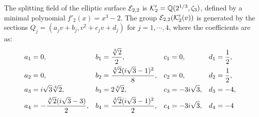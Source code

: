 \documentclass[11pt]{amsart}
\begin{document}
	\begin{thm}
		\label{main5}
	  The splitting field of  the  elliptic surface ${\mathcal E}_{2,2}$ is  ${\mathcal K}'_2 = {\mathbb Q}(2^{1/3}, \zeta_3)$, defined by a minimal polynomial
		$f'_2(x)= x^3 - 2$.
  The group ${\mathcal E}_{2,2}({\mathcal K}'_2(v))$ is generated by the sections $Q_j=(a_j v+ b_j, v^2+ c_j v +d_j)$ for $j=1, \cdots, 4$, where the coefficients are as:
	\begin{align}
	a_1 &= 0, & b_1 &= \frac{\sqrt[3]{2}}{2}, & c_1 &= 0, & d_1 &= \frac{1}{2}, \notag \\
	a_2 &= 0, & b_2 &= \frac{\sqrt[3]{2}(i\sqrt{3}-1)^2}{8}, & c_2 &= 0, & d_2 &= \frac{1}{2},\notag \\
	a_3 &= i\sqrt{3}\sqrt[3]{2}, & b_3 &= 2\sqrt[3]{2}, & c_3 &= -3i\sqrt{3}, & d_3 &= -4,\notag  \\
	a_4 &= -\frac{\sqrt[3]{2}(i\sqrt{3}-3)}{2}, & b_4 &= \frac{\sqrt[3]{2}(i\sqrt{3}-1)^2}{2}, & c_4 &= -3i\sqrt{3}, & d_4 &= -4
\label{Q-(2,2)}
	\end{align}
\end{thm}
 
\end{document}
